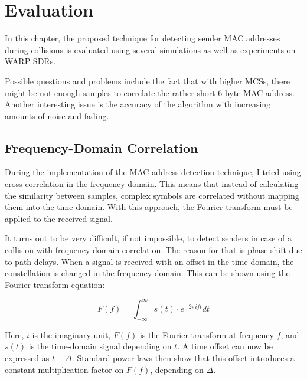 
\chapter{Evaluation}\label{ch:evaluation}
\glsresetall %

In this chapter, the proposed technique for detecting sender \gls{MAC} addresses during collisions is evaluated using several simulations as well as experiments on \gls{WARP} \glspl{SDR}.

Possible questions and problems include the fact that with higher \glspl{MCS}, there might be not enough samples to correlate the rather short 6 byte \gls{MAC} address. Another interesting issue is the accuracy of the algorithm with increasing amounts of noise and fading.



\section{Frequency-Domain Correlation}\label{sec:freqd-correlation}

During the implementation of the \gls{MAC} address detection technique, I tried using cross-correlation in the frequency-domain. This means that instead of calculating the similarity between samples, complex symbols are correlated without mapping them into the time-domain. With this approach, the Fourier transform must be applied to the received signal.

It turns out to be very difficult, if not impossible, to detect senders in case of a collision with frequency-domain correlation. The reason for that is phase shift due to path delays. When a signal is received with an offset in the time-domain, the constellation is changed in the frequency-domain. This can be shown using the Fourier transform equation:

$$ F(f) = \int_{-\infty}^{\infty} s(t) \cdot e^{-2 \pi i f t} dt $$\vspace{0cm}

Here, $ i $ is the imaginary unit, $ F(f) $ is the Fourier transform at frequency $ f $, and $ s(t) $ is the time-domain signal depending on $ t $. A time offset can now be expressed as $ t + \Delta $. Standard power laws then show that this offset introduces a constant multiplication factor on $ F(f) $, depending on $ \Delta $.

